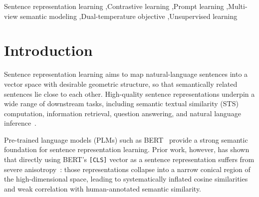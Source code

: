 \documentclass[a4paper,fleqn]{cas-dc}
\begin{document}
\begin{keywords}
Sentence representation learning \sep Contrastive learning \sep Prompt learning \sep Multi-view semantic modeling \sep Dual-temperature objective \sep Unsupervised learning
\end{keywords}

\maketitle


\section{Introduction}
\label{sec:intro}


Sentence representation learning aims to map natural-language sentences into a vector space with desirable geometric structure, so that semantically related sentences lie close to each other. High-quality sentence representations underpin a wide range of downstream tasks, including semantic textual similarity (STS) computation, information retrieval, question answering, and natural language inference~\cite{sts3kcl}.

Pre-trained language models (PLMs) such as BERT~\cite{bert} provide a strong semantic foundation for sentence representation learning.
 Prior work, however, has shown that directly using BERT's \texttt{[CLS]} vector as a sentence representation suffers from severe anisotropy~\cite{kurz2026tacl}: those representations collapse into a narrow conical region of the high-dimensional space, leading to systematically inflated cosine similarities and weak correlation with human-annotated semantic similarity.
\end{document}
